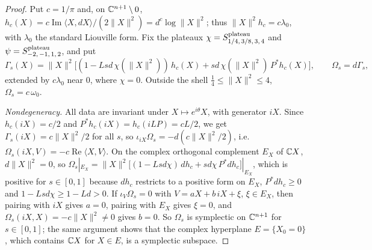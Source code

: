 \begin{proof}
Put $c=1/\pi$ and, on $\mathbb{C}^{n+1}\setminus0$, $h_c(X)=c\operatorname{Im}\langle X,dX\rangle/(2\|X\|^2)=d^c\log\|X\|^2$; thus
$\|X\|^2h_c=c\lambda_0$, with $\lambda_0$ the standard Liouville form. Fix the plateaux
$\chi=S^{\rm plateau}_{1/4,\,3/8,\,3,\,4}$ and $\psi=S^{\rm plateau}_{-2,\,-1,\,1,\,2}$, and put
\[
 \Gamma_s(X)=\|X\|^2\bigl[(1-Lsd\,\chi(\|X\|^2))\,h_c(X)+sd\,\chi(\|X\|^2)\,P^*h_c(X)\bigr],\qquad\Omega_s=d\Gamma_s ,
\]
extended by $c\lambda_0$ near $0$, where $\chi=0$. Outside the shell $\frac14\le\|X\|^2\le4$, $\Omega_s=c\,\omega_0$.

\emph{Nondegeneracy.} All data are invariant under $X\mapsto e^{i\theta}X$, with generator $iX$. Since $h_c(iX)=c/2$ and
$P^*h_c(iX)=h_c(iLP)=cL/2$, we get $\Gamma_s(iX)=c\|X\|^2/2$ for all $s$, so $\iota_{iX}\Omega_s=-d(c\|X\|^2/2)$, i.e.
$\Omega_s(iX,V)=-c\operatorname{Re}\langle X,V\rangle$. On the complex orthogonal complement $E_X$ of $\mathbb{C} X$, $d\|X\|^2=0$, so
$\Omega_s|_{E_X}=\|X\|^2\bigl[(1-Lsd\chi)\,dh_c+sd\chi\,P^*dh_c\bigr]|_{E_X}$, which is positive for $s\in[0,1]$ because
$dh_c$ restricts to a positive form on $E_X$, $P^*dh_c\ge0$ and $1-Lsd\chi\ge1-Ld>0$. If $\iota_V\Omega_s=0$ with
$V=aX+b\,iX+\xi$, $\xi\in E_X$, then pairing with $iX$ gives $a=0$, pairing with $E_X$ gives $\xi=0$, and $\Omega_s(iX,X)=-c\|X\|^2\ne0$
gives $b=0$. So $\Omega_s$ is symplectic on $\mathbb{C}^{n+1}$ for $s\in[0,1]$; the same argument shows that the complex hyperplane
$E=\{X_0=0\}$, which contains $\mathbb{C} X$ for $X\in E$, is a symplectic subspace.


\end{proof}
